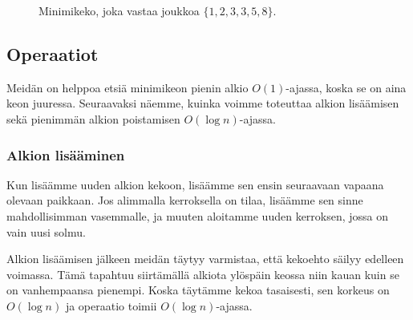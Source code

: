 \begin{figure}
\center
{}
\caption{Minimikeko, joka vastaa joukkoa $\{1,2,3,3,5,8\}$.}
\label{fig:minkek}
\end{figure}

\subsection{Operaatiot}

Meidän on helppoa etsiä minimikeon pienin alkio $O(1)$-ajassa,
koska se on aina keon juuressa.
Seuraavaksi näemme, kuinka voimme toteuttaa alkion lisäämisen
sekä pienimmän alkion poistamisen $O(\log n)$-ajassa.

\subsubsection{Alkion lisääminen}

Kun lisäämme uuden alkion kekoon, lisäämme sen ensin seuraavaan
vapaana olevaan paikkaan. Jos alimmalla kerroksella on tilaa,
lisäämme sen sinne mahdollisimman vasemmalle,
ja muuten aloitamme uuden kerroksen, jossa on vain uusi solmu.

Alkion lisäämisen jälkeen meidän täytyy varmistaa,
että kekoehto säilyy edelleen voimassa.
Tämä tapahtuu siirtämällä alkiota ylöspäin keossa
niin kauan kuin se on vanhempaansa pienempi.
Koska täytämme kekoa tasaisesti, sen korkeus on $O(\log n)$
ja operaatio toimii $O(\log n)$-ajassa.

